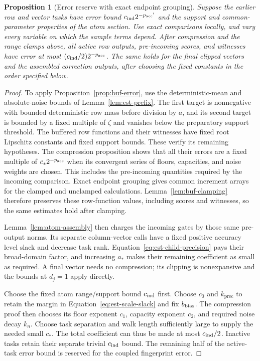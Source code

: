 \documentclass[11pt]{article}
\numberwithin{equation}{section}
\newtheorem{proposition}[theorem]{Proposition}
\theoremstyle{definition}
\theoremstyle{remark}
\begin{document}
\begin{proposition}[Error reserve with exact endpoint grouping]\label{prop:est-clean}
Suppose the earlier row and vector tasks have error bound ${c_{\rm ind}}2^{-{p_{\rm acc}}'}$
and the support and common-parameter properties of the atom section.
Use exact comparisons locally, and vary every variable on which the
sample terms depend.  After compression and the range clamps above, all
active row outputs, pre-incoming scores, and witnesses have error at most
$({c_{\rm ind}}/2)2^{-{p_{\rm acc}}}$.  The same holds for the final clipped vectors and the
assembled correction outputs, after choosing the fixed constants in the
order specified below.
\end{proposition}
\begin{proof}
To apply Proposition~\ref{prop:buf-error}, use the deterministic-mean and
absolute-noise bounds of Lemma~\ref{lem:est-prefix}.  The first target
is nonnegative with bounded deterministic row mass before division by
$a$, and its second target is bounded by a fixed multiple of $\zeta$ and
vanishes below the preparatory support threshold.  The buffered row
functions and their witnesses have fixed root Lipschitz constants and
fixed support bounds.  These verify its remaining hypotheses.  The
compression proposition shows that all their errors are a fixed multiple
of $c_*2^{-{p_{\rm acc}}}$ when its convergent series of
floors, capacities, and noise weights are chosen.  This includes the
pre-incoming quantities required by the incoming comparison.
Exact endpoint grouping gives common increment arrays for the clamped
and unclamped calculations.  Lemma~\ref{lem:buf-clamping} therefore
preserves these row-function values, including scores and witnesses,
so the same estimates hold after clamping.

Lemma~\ref{lem:atom-assembly} then charges the incoming gates by those
same pre-output norms.  Its separate column-vector calls have a fixed
positive accuracy level slack and decrease task rank.  Equation~\eqref{eq:est-child-precision}
pays their broad-domain factor, and increasing ${a}_*$ makes their remaining
coefficient as small as required.  A final vector needs no compression;
its clipping is nonexpansive and the bounds at $d_j=1$ apply directly.

Choose the fixed atom range/support bound ${c_{\rm ind}}$ first.  Choose $c_0$ and
${k}_{\mathrm{prec}}$ to retain the margin in Equation~\eqref{eq:est-scale-slack}
and fix ${b_{\rm bias}}$.  The
compression proof then chooses its floor exponent $c_1$, capacity exponent
$c_2$, and required noise decay ${k}_n$.  Choose task separation and walk
length sufficiently large to supply the needed small $c_*$.  The total
coefficient can thus be made at most ${c_{\rm ind}}/2$.  Inactive tasks retain their
separate trivial ${c_{\rm ind}}$ bound.  The remaining half of the active-task
error bound is reserved for the coupled fingerprint error.
\end{proof}
\end{document}
